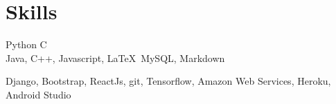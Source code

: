 
\section{Skills}
Python \textbullet{}   C \\
Java, C++, Javascript, \LaTeX\, MySQL, Markdown
\sectionsep

Django, Bootstrap, ReactJs, git, Tensorflow, Amazon Web Services, Heroku, Android Studio
\sectionsep